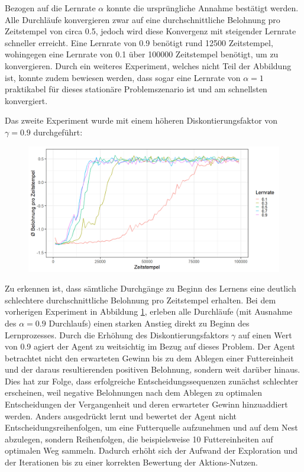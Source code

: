 Bezogen auf die Lernrate $\alpha$ konnte die ursprüngliche Annahme bestätigt werden. Alle Durchläufe konvergieren zwar auf eine durchschnittliche Belohnung pro Zeitstempel von circa 0.5, jedoch wird diese Konvergenz mit steigender Lernrate schneller erreicht. Eine Lernrate von 0.9 benötigt rund 12500 Zeitstempel, wohingegen eine Lernrate von 0.1 über 100000 Zeitstempel benötigt, um zu konvergieren. Durch ein weiteres Experiment, welches nicht Teil der Abbildung ist, konnte zudem bewiesen werden, dass sogar eine Lernrate von $\alpha = 1$ praktikabel für dieses stationäre Problemszenario ist und am schnellsten konvergiert.
\par 
Das zweite Experiment wurde mit einem höheren Diskontierungsfaktor von $\gamma=0.9$ durchgeführt:
\begin{figure}[H]
    \centering
    \includegraphics[width=\textwidth]{images/antGameAnalysis09DiscA}
    \label{fig:gamma09}
\end{figure}
Zu erkennen ist, dass sämtliche Durchgänge zu Beginn des Lernens eine deutlich schlechtere durchschnittliche Belohnung pro Zeitstempel erhalten. Bei dem vorherigen Experiment in Abbildung \ref{fig:gamma09}, erleben alle Durchläufe (mit Ausnahme des $\alpha = 0.9$ Durchlaufs) einen starken Anstieg direkt zu Beginn des Lernprozesses. Durch die Erhöhung des Diskontierungsfaktors $\gamma$ auf einen Wert von 0.9 agiert der Agent zu weitsichtig im Bezug auf dieses Problem. Der Agent betrachtet nicht den erwarteten Gewinn bis zu dem Ablegen einer Futtereinheit und der daraus resultierenden positiven Belohnung, sondern weit darüber hinaus. Dies hat zur Folge, dass erfolgreiche Entscheidungssequenzen zunächst schlechter erscheinen, weil negative Belohnungen nach dem Ablegen zu optimalen Entscheidungen der Vergangenheit und deren erwarteter Gewinn hinzuaddiert werden. Anders ausgedrückt lernt und bewertet der Agent nicht Entscheidungsreihenfolgen, um eine Futterquelle aufzunehmen und auf dem Nest abzulegen, sondern Reihenfolgen, die beispielsweise 10 Futtereinheiten auf optimalen Weg sammeln. Dadurch erhöht sich der Aufwand der Exploration und der Iterationen bis zu einer korrekten Bewertung der Aktions-Nutzen.
